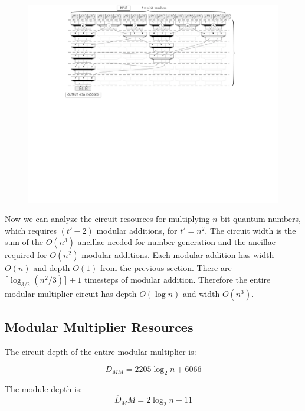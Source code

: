 \documentclass[twoside]{article}
\begin{document}
\begin{figure}[htb!]
\centerline{
\includegraphics[width=5.5in]{./mod-mult-add.pdf}
}
\label{fig:mod-mult}
\end{figure}
%

Now we can analyze the circuit resources for multiplying $n$-bit
quantum numbers, which requires $(t'-2)$ modular additions, for $t'=n^2$.
The circuit width is the sum of the $O(n^3)$ ancillae
needed for number generation and the ancillae required for $O(n^2)$
modular additions. Each modular addition has width $O(n)$ and depth $O(1)$
from the previous
section. There are
$\lceil \log_{3/2}(n^2 / 3) \rceil +1 $ timesteps of modular addition. Therefore
the entire modular multiplier circuit has depth $O(\log n)$ and width $O(n^3)$.

\subsection{Modular Multiplier Resources}

The circuit depth of the entire modular multiplier is:

\begin{equation}
D_{MM} = 2205 \log_2 n + 6066
\end{equation}

The module depth is:
\begin{equation}
\overline{D}_MM = 2\log_2 n + 11
\end{equation}
\end{document}
